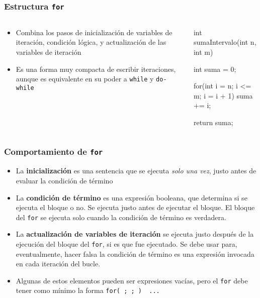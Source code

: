 \documentclass{beamer}
\newcommand{\codet}[1]{\texttt{#1}}
\begin{document}
\begin{frame}[fragile]
  \frametitle{Estructura \codet{for}}

  \begin{columns}
    \begin{column}{0.4\textwidth}
      \begin{itemize}
        
      \item Combina los pasos de inicialización de variables de
        iteración, condición lógica, y actualización de las variables
        de iteración
        
      \item Es una forma muy compacta de escribir iteraciones, aunque
        es equivalente en su poder a \codet{while} y \codet{do-while}

      \end{itemize}      
    \end{column}
    \begin{column}{0.6\textwidth}
\begin{jsmall}
        int sumaIntervalo(int n, int m) {
          int suma = 0;

          for(int i = n; i <= m; i = i + 1) {
            suma += i;
          }
          
          return suma;
        }
\end{jsmall}
    \end{column}
  \end{columns}

\end{frame}

\begin{frame}[fragile]
  \frametitle{Comportamiento de \codet{for}}

  \begin{itemize}
  \item La \textbf{inicialización} es una sentencia que se ejecuta \emph{solo una vez}, justo antes de evaluar la condición de término

  \item La \textbf{condición de término} es una expresión booleana,
    que determina si se ejecuta el bloque o no. Se ejecuta justo antes
    de ejecutar el bloque. El bloque del \codet{for} se ejecuta solo
    cuando la condición de término es verdadera.    

  \item La \textbf{actualización de variables de iteración} se ejecuta
    justo después de la ejecución del bloque del \codet{for}, si es
    que fue ejecutado. Se debe usar para, eventualmente, hacer falsa
    la condición de término es una expresión invocada en cada iteración del bucle.

  \item Algunas de estos elementos pueden ser expresiones vacías, pero
    el \codet{for} debe tener como mínimo la forma \codet{for( ; ; ) { ... }}
  \end{itemize}
\end{frame}
\end{document}
